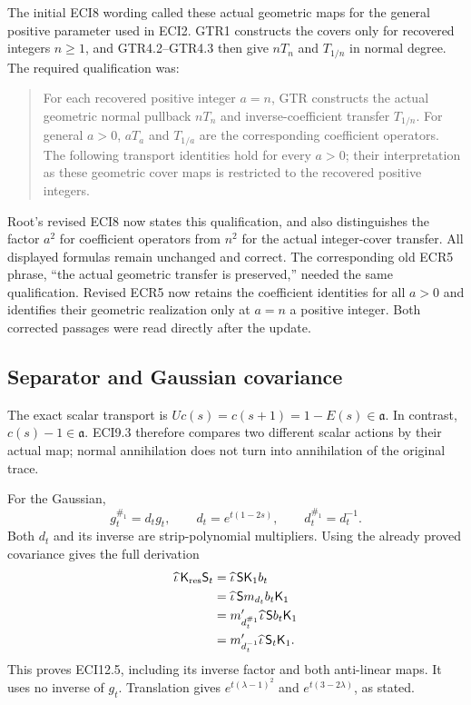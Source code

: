 The initial ECI8 wording called these actual geometric maps for the
general positive parameter used in ECI2. GTR1 constructs the covers only
for recovered integers \(n\ge1\), and GTR4.2--GTR4.3 then give \(nT_n\)
and \(T_{1/n}\) in normal degree. The required qualification was:

\begin{quote}
For each recovered positive integer \(a=n\), GTR constructs the actual
geometric normal pullback \(nT_n\) and inverse-coefficient transfer
\(T_{1/n}\). For general \(a>0\), \(aT_a\) and \(T_{1/a}\) are the
corresponding coefficient operators. The following transport identities
hold for every \(a>0\); their interpretation as these geometric cover
maps is restricted to the recovered positive integers.
\end{quote}

Root's revised ECI8 now states this qualification, and also
distinguishes the factor \(a^2\) for coefficient operators from \(n^2\)
for the actual integer-cover transfer. All displayed formulas remain
unchanged and correct. The corresponding old ECR5 phrase, ``the actual
geometric transfer is preserved,'' needed the same qualification.
Revised ECR5 now retains the coefficient identities for all \(a>0\) and
identifies their geometric realization only at \(a=n\) a positive
integer. Both corrected passages were read directly after the update.

\subsection{Separator and Gaussian
covariance}\label{separator-and-gaussian-covariance}

The exact scalar transport is \(Uc(s)=c(s+1)=1-E(s)\in\mathfrak a\). In
contrast, \(c(s)-1\in\mathfrak a\). ECI9.3 therefore compares two
different scalar actions by their actual map; normal annihilation does
not turn into annihilation of the original trace.

For the Gaussian, \[
g_t^{\#_1}=d_tg_t,\qquad
d_t=e^{t(1-2s)},\qquad d_t^{\#_1}=d_t^{-1}.
\] Both \(d_t\) and its inverse are strip-polynomial multipliers. Using
the already proved covariance gives the full derivation \[
\begin{aligned}
\widehat\iota\,\mathsf K_{\rm res}\mathsf S_t
&=\widehat\iota\,\mathsf S\mathsf K_1b_t\\
&=\widehat\iota\,\mathsf S m_{d_t}b_t\mathsf K_1\\
&=m_{d_t^{\#_1}}'\widehat\iota\,\mathsf S b_t\mathsf K_1\\
&=m_{d_t^{-1}}'\widehat\iota\,\mathsf S_t\mathsf K_1.
\end{aligned}
\] This proves ECI12.5, including its inverse factor and both
anti-linear maps. It uses no inverse of \(g_t\). Translation gives
\(e^{t(\lambda-1)^2}\) and \(e^{t(3-2\lambda)}\), as stated.

